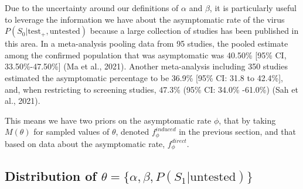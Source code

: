 \documentclass[12pt,twoside]{smiththesis}
\begin{document}
Due to the uncertainty around our definitions of \(\alpha\) and \(\beta\), it is particularly useful to leverage the information we have about the asymptomatic rate of the virus \(P(S_0|\text{test}_+,\text{untested})\) because a large collection of studies has been published in this area. In a meta-analysis pooling data from 95 studies, the pooled estimate among the confirmed population that was asymptomatic was 40.50\% {[}95\% CI, 33.50\%-47.50\%{]} (Ma et al., 2021). Another meta-analysis including 350 studies estimated the asymptomatic percentage to be 36.9\% {[}95\% CI: 31.8 to 42.4\%{]}, and, when restricting to screening studies, 47.3\% (95\% CI: 34.0\% -61.0\%) (Sah et al., 2021).

This means we have two priors on the asymptomatic rate \(\phi\), that by taking \(M(\theta)\) for sampled values of \(\theta\), denoted \(f_\phi^{induced}\) in the previous section, and that based on data about the asymptomatic rate, \(f_\phi^{direct}\).

\newpage

\hypertarget{distribution-of-theta-alpha-beta-ps_1textuntested}{%
\subsection{\texorpdfstring{Distribution of \(\theta = \{\alpha, \beta, P(S_1|\text{untested}) \}\)}{Distribution of \textbackslash theta = \textbackslash\{\textbackslash alpha, \textbackslash beta, P(S\_1\textbar\textbackslash text\{untested\}) \textbackslash\}}}\label{distribution-of-theta-alpha-beta-ps_1textuntested}}
\end{document}
